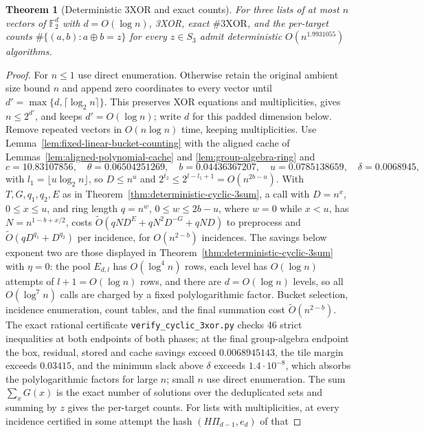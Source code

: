 \documentclass[11pt]{article}
\newtheorem{theorem}{Theorem}
\newcommand{\softO}{\widetilde O}
\begin{document}
\begin{theorem}[Deterministic 3XOR and exact counts]
\label{thm:deterministic-3xor}
For three lists of at most $n$ vectors of $\mathbb F_2^d$ with
$d=O(\log n)$, 3XOR, exact $\#3\mathrm{XOR}$, and the per-target counts
$\#\{(a,b):a\oplus b=z\}$ for every $z\in S_3$ admit deterministic
$O(n^{1.9931055})$ algorithms.
\end{theorem}
\begin{proof}
For $n\le1$ use direct enumeration. Otherwise retain the original ambient
size bound $n$ and append zero coordinates to every vector until
$d'=\max\{d,\lceil\log_2 n\rceil\}$. This preserves XOR equations and
multiplicities, gives $n\le2^{d'}$, and keeps $d'=O(\log n)$; write $d$
for this padded dimension below.
Remove repeated vectors in $O(n\log n)$ time, keeping multiplicities.
Use Lemma~\ref{lem:fixed-linear-bucket-counting} with the aligned cache
of Lemmas~\ref{lem:aligned-polynomial-cache} and
\ref{lem:group-algebra-ring} and
\[
 c=10.83107856,\quad\theta=0.06504251269,\quad b=0.04436367207,\quad
 u=0.0785138659,\quad\delta=0.0068945,
\]
with $l_1=\lfloor u\log_2n\rfloor$, so $D\le n^u$ and
$2^{t_2}\le2^{l-l_1+1}=O(n^{2b-u})$.  With $T,G,q_1,q_2,E$ as in
Theorem~\ref{thm:deterministic-cyclic-3sum}, a call with $D=n^x$,
$0\le x\le u$, and ring length $q=n^w$, $0\le w\le2b-u$, where $w=0$
while $x<u$, has $N=n^{1-b+x/2}$, costs
$\softO(qND^E+qN^2D^{-G}+qND)$ to preprocess and
$\softO(qD^{q_1}+D^{q_2})$ per incidence, for $O(n^{2-b})$ incidences.
The savings below exponent two are those displayed in
Theorem~\ref{thm:deterministic-cyclic-3sum} with $\eta=0$: the pool
$E_{d,l}$ has $O(\log^4n)$ rows, each level has $O(\log n)$ attempts of
$l+1=O(\log n)$ rows, and there are $d=O(\log n)$ levels, so all
$O(\log^7n)$ calls are charged by a fixed polylogarithmic factor.
Bucket selection, incidence enumeration, count tables, and the final
summation cost $\softO(n^{2-b})$.  The exact rational certificate
\texttt{verify\_\allowbreak cyclic\_\allowbreak 3xor.py} checks 46 strict inequalities at both
endpoints of both phases; at the final group-algebra endpoint the box,
residual, stored and cache savings exceed $0.0068945143$, the tile
margin exceeds $0.03415$, and the minimum slack above $\delta$ exceeds
$1.4\cdot10^{-8}$, which absorbs the polylogarithmic factors for large
$n$; small $n$ use direct enumeration.  The sum $\sum_xG(x)$ is the
exact number of solutions over the deduplicated sets and summing by $z$
gives the per-target counts.  For lists with multiplicities, at every
incidence certified in some attempt the hash $(H\Pi_{d-1},e_d)$ of that

\end{proof}
\end{document}
